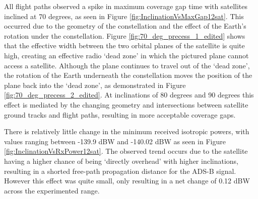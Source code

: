 All flight paths observed a spike in maximum coverage gap time with satellites inclined at 70 degrees, as seen in Figure \ref{fig:InclinationVsMaxGap12sat}. This occurred due to the geometry of the constellation and the effect of the Earth's rotation under the constellation. Figure \ref{fig:70_deg_precess_1_edited} shows that the effective width between the two orbital planes of the satellite is quite high, creating an effective radio `dead zone' in which the pictured plane cannot access a satellite. Although the plane continues to travel out of the `dead zone', the rotation of the Earth underneath the constellation moves the position of the plane back into the `dead zone', as demonstrated in  Figure \ref{fig:70_deg_precess_2_edited}. At inclinations of 80 degrees and 90 degrees this effect is mediated by the changing geometry and intersections between satellite ground tracks and flight paths, resulting in more acceptable coverage gaps.

There is relatively little change in the minimum received isotropic powers, with values ranging between -139.9 dBW and -140.02 dBW as seen in Figure \ref{fig:InclinationVsRxPower12sat}. The observed trend occurs due to the satellite having a higher chance of being `directly overhead' with higher inclinations, resulting in a shorted free-path propagation distance for the ADS-B signal. However this effect was quite small, only resulting in a net change of 0.12 dBW across the experimented range.

